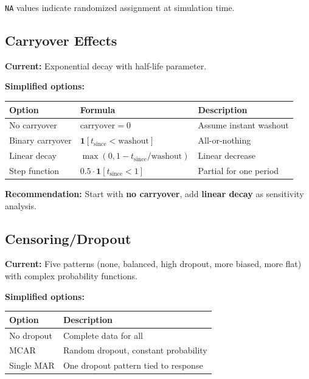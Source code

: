 \documentclass[11pt]{article}
\begin{document}
\texttt{NA} values indicate randomized assignment at simulation time.


\subsection{Carryover Effects}

\textbf{Current:} Exponential decay with half-life parameter.

\textbf{Simplified options:}

\begin{table}[h]
\centering\small
\begin{tabular}{@{}L{3cm}L{5.5cm}L{4.5cm}@{}}
\toprule
Option & Formula & Description \\
\midrule
No carryover & $\text{carryover} = 0$ & Assume instant washout \\
Binary carryover & $\mathbf{1}[t_{\text{since}} < \text{washout}]$ & All-or-nothing \\
Linear decay & $\max(0, 1 - t_{\text{since}}/\text{washout})$ & Linear decrease \\
Step function & $0.5 \cdot \mathbf{1}[t_{\text{since}} < 1]$ & Partial for one period \\
\bottomrule
\end{tabular}
\end{table}

\textbf{Recommendation:} Start with \textbf{no carryover}, add
\textbf{linear decay} as sensitivity analysis.


\subsection{Censoring/Dropout}

\textbf{Current:} Five patterns (none, balanced, high dropout, more
biased, more flat) with complex probability functions.

\textbf{Simplified options:}

\begin{table}[h]
\centering
\begin{tabular}{@{}ll@{}}
\toprule
Option & Description \\
\midrule
No dropout & Complete data for all \\
MCAR & Random dropout, constant probability \\
Single MAR & One dropout pattern tied to response \\
\bottomrule
\end{tabular}
\end{table}
\end{document}

